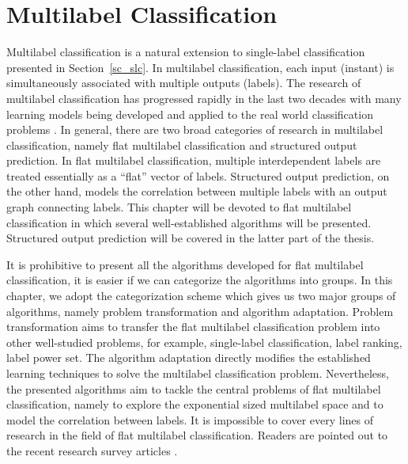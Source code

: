 {




%
%
\chapter{Multilabel Classification} \label{ch_fmlc}

Multilabel classification is a natural extension to single-label classification presented in Section~\ref{sc_slc}.
In multilabel classification, each input (instant) is simultaneously associated with multiple outputs (labels).
The research of multilabel classification has progressed rapidly in the last two decades with many learning models being developed and applied to the real world classification problems \citep{lafferty01,taskar02,Taskar04max,THJA04,Rousu07}.
In general, there are two broad categories of research in multilabel classification, namely flat multilabel classification and structured output prediction.
In flat multilabel classification, multiple interdependent labels are treated essentially as a ``flat'' vector of labels.
Structured output prediction, on the other hand, models the correlation between multiple labels with an output graph connecting labels.
This chapter will be devoted to flat multilabel classification in which several well-established algorithms will be presented.
Structured output prediction will be covered in the latter part of the thesis.

It is prohibitive to present all the algorithms developed for flat multilabel classification, it is easier if we can categorize the algorithms into groups.
In this chapter, we adopt the categorization scheme \citep{Tsoumakas07multi,Tsoumakas10mining} which gives us two major groups of algorithms, namely problem transformation and algorithm adaptation.
Problem transformation aims to transfer the flat multilabel classification problem into other well-studied problems, for example, single-label classification, label ranking, label power set.
The algorithm adaptation directly modifies the established learning techniques to solve the multilabel classification problem.
Nevertheless, the presented algorithms aim to tackle the central problems of flat multilabel classification, namely to explore the exponential sized multilabel space and to model the correlation between labels.
It is impossible to cover every lines of research in the field of flat multilabel classification.
Readers are pointed out to the recent research survey articles \citep{Tsoumakas07multi,Tsoumakas10mining,Zhang14a}.



}
